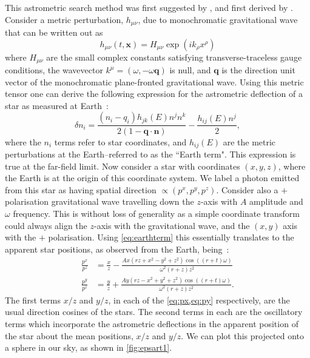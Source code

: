 This astrometric search method was first suggested by \cite{VB}, and first derived by \cite{1996ApJ...465..566P}. Consider a metric perturbation, $h_{\mu \nu}$, due to monochromatic gravitational wave that can be written out as
%
\begin{equation}
h_{\mu \nu}(t,\textbf{x})= H_{\mu \nu} \exp( ik_{\rho}x^{\rho } )
\end{equation}
%
where $H_{\mu \nu}$ are the small complex constants satisfying transverse-traceless gauge conditions, the wavevector $k^{\mu} = (\omega, -\omega \textbf{q})$ is null, and $\textbf{q}$ is the direction unit vector of the monochromatic plane-fronted gravitational wave. Using this metric tensor one can derive the following expression for the astrometric deflection of a star as measured at Earth~\cite{Mihaylov_2020,1996ApJ...465..566P}:
%
\begin{equation}
\delta n_i = \frac{(n_i - q_i) h_{jk}(E)n^j n^k}{2(1-\textbf{q} \cdot \textbf{n})}-\frac{h_{ij}(E) n^j}{2},
\label{eq:earthterm}
\end{equation}
%
where the $n_i$ terms refer to star coordinates, and $h_{ij}(E)$ are the metric perturbations at the Earth--referred to as the ``Earth term". This expression is true at the far-field limit. Now consider a star with coordinates $(x,y,z)$, where the Earth is at the origin of this coordinate system. We label a photon emitted from this star as having spatial direction $\propto (p^x,p^y,p^z)$. Consider also a $+$ polarisation gravitational wave travelling down the $z$-axis with $A$ amplitude and $\omega$ frequency. This is without loss of generality as a simple coordinate transform could always align the $z$-axis with the gravitational wave, and the $(x,y)$ axis with the $+$ polarisation. Using \cref{eq:earthterm} this essentially translates to the apparent star positions, as observed from the Earth, being~\cite{Lasenby_2019}:
\begin{align}
    \frac{p^x}{p^z} &= \frac{x}{z}-\frac{A x \left(r z +x^2-y^2+z^2\right)\cos \left(\left(r + t \right) \omega \right) }{\omega^2 \left(r +z \right) z^2} \label{eq:px}\\
    \frac{p^y}{p^z} &= \frac{y}{z}+\frac{A y \left(r z -x^2+y^2+z^2\right)\cos \left(\left(r + t \right) \omega \right) }{\omega^2 \left(r +z \right) z^2}. \label{eq:py}
\end{align}
%
The first terms $x/z$ and $y/z$, in each of the \cref{eq:px,eq:py} respectively, are the usual direction cosines of the stars. The second terms in each are the oscillatory terms which incorporate the astrometric deflections in the apparent position of the star about the mean positions, $x/z$ and $y/z$. We can plot this projected onto a sphere in our sky, as shown in \cref{fig:epsart1}.

